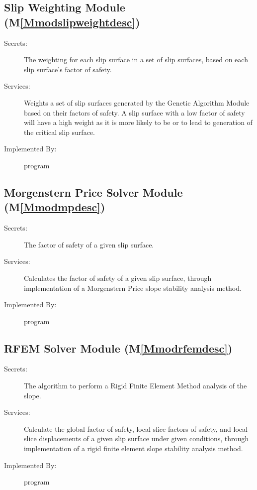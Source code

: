 \documentclass[12pt]{article}
\begin{document}
\subsection{Slip Weighting Module (M\ref{Mmodslipweightdesc})}
\label{Sec:SWM()}
\begin{description}
\item[Secrets:]The weighting for each slip surface in a set of slip surfaces, based on each slip surface's factor of safety.
\item[Services:]Weights a set of slip surfaces generated by the Genetic Algorithm Module based on their factors of safety. A slip surface with a low factor of safety will have a high weight as it is more likely to be or to lead to generation of the critical slip surface.
\item[Implemented By:]program
\end{description}
\subsection{Morgenstern Price Solver Module (M\ref{Mmodmpdesc})}
\label{Sec:MPSM()}
\begin{description}
\item[Secrets:]The factor of safety of a given slip surface.
\item[Services:]Calculates the factor of safety of a given slip surface, through implementation of a Morgenstern Price slope stability analysis method.
\item[Implemented By:]program
\end{description}
\subsection{RFEM Solver Module (M\ref{Mmodrfemdesc})}
\label{Sec:RSM()}
\begin{description}
\item[Secrets:]The algorithm to perform a Rigid Finite Element Method analysis of the slope.
\item[Services:]Calculate the global factor of safety, local slice factors of safety, and local slice displacements of a given slip surface under given conditions, through implementation of a rigid finite element slope stability analysis method.
\item[Implemented By:]program
\end{description}
\end{document}
